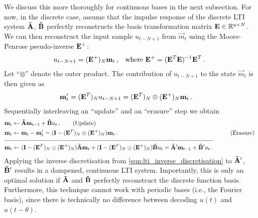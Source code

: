 We discuss this more thoroughly for continuous bases in the next subsection.
For now, in the discrete case, assume that the impulse response of the discrete LTI system $\mathbf{\tilde A}$, $\mathbf{\tilde B}$ perfectly reconstructs the basis transformation matrix $\mathbf{E} \in \mathbb{R}^{q \times N}$.
We can then reconstruct the input sample $u_{t - N + 1}$ from $\vec m_t$ using the Moore-Penrose pseudo-inverse $\mathbf{E}^+$:
\begin{align*}
	u_{t - N + 1} &= (\mathbf{E}^+)_{N} \mathbf{m}_t \,, & \text{where } \mathbf{E}^+ = (\mathbf{E}^T \mathbf{E})^{-1} \mathbf{E}^T\,.
\end{align*}
Let \enquote{$\otimes$} denote the outer product.
The contribution of $u_{t - N + 1}$ to the state $\vec m_t$ is then given as
\begin{align*}
 	\mathbf{m}'_t &= ( \mathbf{E}^T)_N u_{t - N + 1} = ( \mathbf{E}^T)_N \otimes (\mathbf{E}^+)_N\mathbf{m}_t \,.
\end{align*}
Sequentially interleaving an \enquote{update} and an \enquote{erasure} step we obtain
\begin{align}
 	\vec m_t &\gets \mat{\tilde A} \vec m_{t - 1} + \mat{\tilde B} u_t \,, \tag{Update}\\
 	\vec m_t &\gets \vec m_t - \vec m'_t = ( \mat I - ( \mat E^T )_N \otimes (\mat E^+)_N ) \vec m_t \,. & \tag{Erasure}\\[-0.5em]
 	\cline{1-2}
 	\vec m_t &\gets
 		(\mat I - ( \mat E^T )_N \odot (\mat E^+)_N ) \mat{\tilde A} \vec m_t
 		+ (\mat I - ( \mat E^T )_N \odot (\mat E^+ )_N ) \mat{\tilde B} u_t
 		=   \mat{{\tilde A}'} \vec m_{t - 1} + \mat{{\tilde B}'} u_t  \,.
	\label{eqn:information_erasure_discrete}
\end{align}
Applying the inverse discretisation from \cref{eqn:lti_inverse_discretisation} to $\mathbf{\tilde A}'$, $\mathbf{\tilde B}'$ results in a dampened, continuous LTI system.
Importantly, this is only an optimal solution if $\mathbf{\tilde A}$ and $\mathbf{\tilde B}$ perfectly reconstruct the discrete function basis.
Furthermore, this technique cannot work with periodic bases (i.e., the Fourier basis), since there is technically no difference between decoding $u(t)$ and $u(t - \theta)$.

